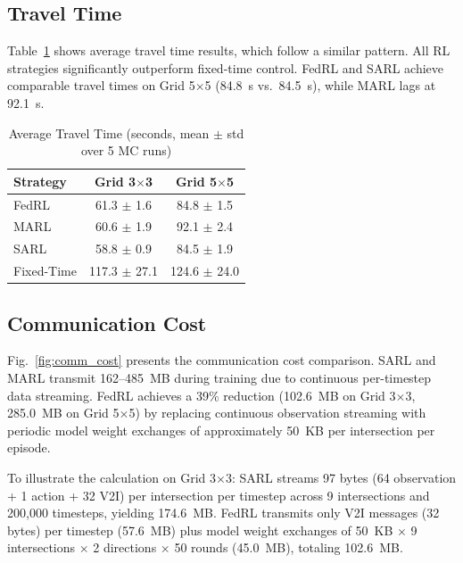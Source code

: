 \documentclass[conference]{IEEEtran}
\begin{document}
\subsection{Travel Time}

Table~\ref{tab:travel_time} shows average travel time results, which follow a similar pattern. All RL strategies significantly outperform fixed-time control. FedRL and SARL achieve comparable travel times on Grid 5$\times$5 (84.8~s vs.\ 84.5~s), while MARL lags at 92.1~s.

\begin{table}[htbp]
\caption{Average Travel Time (seconds, mean $\pm$ std over 5 MC runs)}
\begin{center}
\begin{tabular}{lcc}
\toprule
\textbf{Strategy} & \textbf{Grid 3$\times$3} & \textbf{Grid 5$\times$5} \\
\midrule
FedRL & 61.3 $\pm$ 1.6 & 84.8 $\pm$ 1.5 \\
MARL & 60.6 $\pm$ 1.9 & 92.1 $\pm$ 2.4 \\
SARL & 58.8 $\pm$ 0.9 & 84.5 $\pm$ 1.9 \\
Fixed-Time & 117.3 $\pm$ 27.1 & 124.6 $\pm$ 24.0 \\
\bottomrule
\end{tabular}
\label{tab:travel_time}
\end{center}
\end{table}

\subsection{Communication Cost}

Fig.~\ref{fig:comm_cost} presents the communication cost comparison. SARL and MARL transmit 162--485~MB during training due to continuous per-timestep data streaming. FedRL achieves a 39\% reduction (102.6~MB on Grid 3$\times$3, 285.0~MB on Grid 5$\times$5) by replacing continuous observation streaming with periodic model weight exchanges of approximately 50~KB per intersection per episode.

To illustrate the calculation on Grid 3$\times$3: SARL streams 97 bytes (64 observation + 1 action + 32 V2I) per intersection per timestep across 9 intersections and 200,000 timesteps, yielding 174.6~MB. FedRL transmits only V2I messages (32 bytes) per timestep (57.6~MB) plus model weight exchanges of 50~KB $\times$ 9 intersections $\times$ 2 directions $\times$ 50 rounds (45.0~MB), totaling 102.6~MB.
\end{document}
